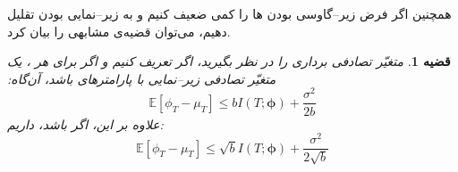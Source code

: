 \documentclass[a4paper,12pt]{article}
\newtheorem{thm}{{\large\bf قضیه}}[section]
\newcommand{\E}{\mathbb{E}}
\newcommand{\bfphi}{\bm {\phi}}
\begin{document}
	همچنین اگر فرض زیر--گاوسی بودن
	ها
	را کمی ضعیف کنیم و به زیر--نمایی بودن تقلیل دهیم، می‌توان قضیه‌ی مشابهی را بیان کرد.
	\begin{thm}\label{mainthm_ext2}
		متغیّر تصادفی برداری
		\lr{$\bfphi = (\phi_1,\cdots,\phi_m)$}
		را در نظر بگیرید، اگر تعریف کنیم
		\lr{$\bm{\mu} = \E[\bm{\phi}]$}
		و اگر برای هر
		،
		یک متغیّر تصادفی زیر--نمایی با پارامترهای
		باشد، آن‌گاه:
		\begin{equation}
		\E[\phi_T-\mu_T]\leq bI(T;\bm{\phi}) + \frac{\sigma^2}{2b}
		\end{equation}
		علاوه بر این، اگر
		باشد، داریم:
		\begin{equation}
		\E[\phi_T-\mu_T]\leq \sqrt{b}I(T;\bm{\phi}) + \frac{\sigma^2}{2\sqrt{b}}
		\end{equation}
	\end{thm}
	
\end{document}
